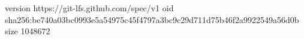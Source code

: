 version https://git-lfs.github.com/spec/v1
oid sha256:be740a03bc0993e5a54975c45f4797a3bc9c29d711d75b46f2a9922549a56d0b
size 1048672
